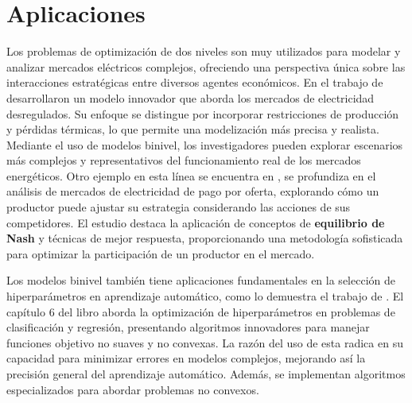 \section{Aplicaciones}
Los problemas de optimización de dos niveles son muy utilizados para modelar y analizar mercados eléctricos complejos, ofreciendo una perspectiva única sobre las interacciones estratégicas entre diversos agentes económicos.
En el trabajo de  \cite{Aussel2016DeregulatedEM} desarrollaron un modelo innovador que aborda los mercados de electricidad desregulados. Su enfoque se distingue por incorporar restricciones de producción y pérdidas térmicas, lo que permite una modelización más precisa y realista. Mediante el uso de modelos binivel, los investigadores pueden explorar escenarios más complejos y representativos del funcionamiento real de los mercados energéticos.
Otro ejemplo en esta línea se encuentra en \cite{Aussel2017NashEI}, se profundiza en el análisis de mercados de electricidad de pago por oferta, explorando cómo un productor puede ajustar su estrategia considerando las acciones de sus competidores. El estudio destaca la aplicación de conceptos de \textbf{equilibrio de Nash} y técnicas de mejor respuesta, proporcionando una metodología sofisticada para optimizar la participación de un productor en el mercado.


Los modelos binivel también tiene aplicaciones fundamentales en la selección de hiperparámetros en aprendizaje automático, como lo demuestra el trabajo de \cite{DempeyZemkoho2020ML}. El capítulo 6 del libro aborda la optimización de hiperparámetros en problemas de clasificación y regresión, presentando algoritmos innovadores para manejar funciones objetivo no suaves y no convexas. La razón del uso de esta radica en su capacidad para minimizar errores en modelos complejos, mejorando así la precisión general del aprendizaje automático. Además, se implementan algoritmos especializados para abordar problemas no convexos.

